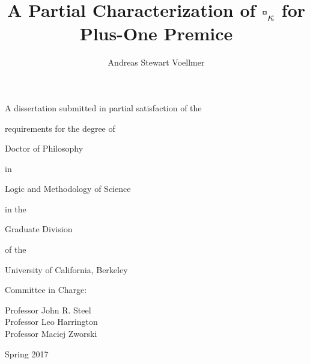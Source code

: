 \documentclass[12pt]{article}
\title{A Partial Characterization of $\square_\kappa$ for Plus-One Premice}
\author{Andreas Stewart Voellmer}
\date{}
\begin{document}
\maketitle


\begin{center}
A dissertation submitted in partial satisfaction of the\\

\smallskip

requirements for the degree of\\

\smallskip

Doctor of Philosophy\\

\smallskip

in\\

\smallskip

Logic and Methodology of Science\\

\smallskip

in the \\

\smallskip

Graduate Division\\

\smallskip

of the\\

\smallskip

University of California, Berkeley\\

\bigskip

\bigskip

\bigskip

\bigskip

Committee in Charge:\\

\bigskip

Professor John R. Steel\\

Professor Leo Harrington\\

Professor Maciej Zworski\\

\bigskip

\bigskip

\bigskip

\bigskip

\bigskip

Spring 2017





\end{center}
\end{document}
